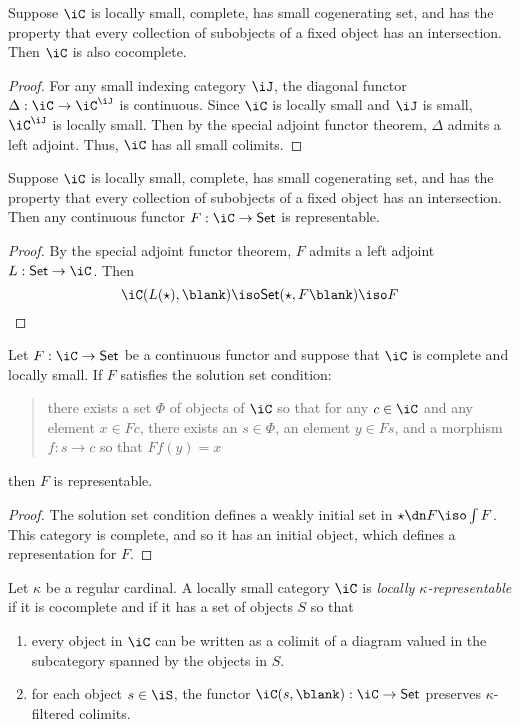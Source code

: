\documentclass{amsart}
\begin{document}
\begin{cor}
  Suppose $\iC$ is locally small, complete, has small cogenerating set, and has the property that every collection of subobjects of a fixed object has an intersection.
  Then $\iC$ is also cocomplete.
\end{cor}
\begin{proof}
  For any small indexing category $\iJ$, the diagonal functor $\Delta : \iC \to \iC^{\iJ}$ is continuous.
  Since $\iC$ is locally small and $\iJ$ is small, $\iC^{\iJ}$ is locally small.
  Then by the special adjoint functor theorem, $\Delta$ admits a left adjoint.
  Thus, $\iC$ has all small colimits.
\end{proof}

\begin{cor}
  Suppose $\iC$ is locally small, complete, has small cogenerating set, and has the property that every collection of subobjects of a fixed object has an intersection.
  Then any continuous functor $F : \iC \to \mathsf{Set}$ is representable.
\end{cor}
\begin{proof}
  By the special adjoint functor theorem, $F$ admits a left adjoint $L : \mathsf{Set} \to \iC$.
  Then
  \[
    \iC(L(\star),\blank) \iso \mathsf{Set}(\star,F\blank) \iso F
  \]
\end{proof}

\begin{thm}
  Let $F : \iC \to \mathsf{Set}$ be a continuous functor and suppose that $\iC$ is complete and locally small.
  If $F$ satisfies the solution set condition:
  \begin{quote}
    there exists a set $\Phi$ of objects of $\iC$ so that for any $c \in \iC$ and any element $x \in Fc$, there exists an $s \in \Phi$, an element $y \in Fs$, and a morphism $f : s \to c$ so that $Ff(y) = x$
  \end{quote}
  then $F$ is representable.
\end{thm}
\begin{proof}
  The solution set condition defines a weakly initial set in $\star \dn F \iso \int F$.
  This category is complete, and so it has an initial object, which defines a representation for $F$.
\end{proof}

\begin{defn}
  Let $\kappa$ be a regular cardinal.
  A locally small category $\iC$ is \emph{locally $\kappa$-representable} if it is cocomplete and if it has a set of objects $S$ so that
  \begin{enumerate}
  \item every object in $\iC$ can be written as a colimit of a diagram valued in the subcategory spanned by the objects in $S$.
  \item for each object $s \in \iS$, the functor $\iC(s, \blank) : \iC \to \mathsf{Set}$ preserves $\kappa$-filtered colimits.
  \end{enumerate}
\end{defn}
\end{document}
